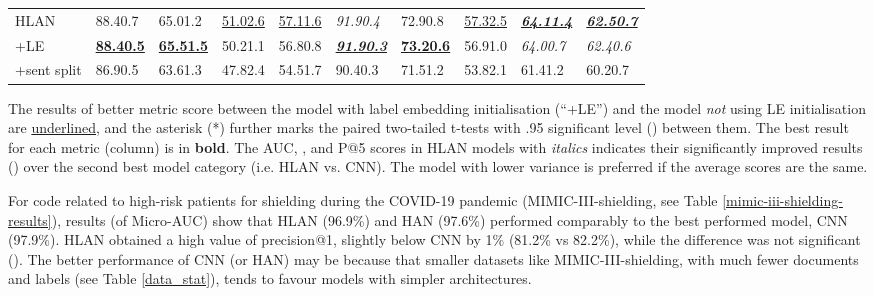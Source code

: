 \documentclass[final,5p,times,twocolumn]{elsarticle}
\begin{document}
\begin{table*}[th]
\begin{threeparttable}
\begin{tabular}{lllll|llll|l}
\cline{1-10}
HLAN                  & 88.40.7 & 65.01.2 & \underline{51.02.6} & \underline{57.11.6} & \textit{91.90.4} & 72.90.8 & \underline{57.32.5} & \textit{\textbf{\underline{64.11.4}}} & \textit{\textbf{\underline{62.50.7}}} \\
+LE                   & \textbf{\underline{88.40.5}} & \textbf{\underline{65.51.5}} & 50.21.1 & 56.80.8 & \textit{\textbf{\underline{91.90.3}}} & \textbf{\underline{73.20.6}} & 56.91.0 & \textit{64.00.7} & \textit{62.40.6} \\
+sent split           & 86.90.5 & 63.61.3 & 47.82.4 & 54.51.7 & 90.40.3 & 71.51.2 & 53.82.1 & 61.41.2 & 60.20.7 \\
\cline{1-10}
\end{tabular}
\begin{tablenotes}
\item The results of better metric score between the model with label embedding initialisation (``+LE'') and the model \textit{not} using LE initialisation are \underline{underlined}, and the asterisk (*) further marks the paired two-tailed t-tests with .95 significant level () between them. The best result for each metric (column) is in \textbf{bold}. The AUC, , and P@5 scores in HLAN models with \textit{italics} indicates their significantly improved results () over the second best model category (i.e. HLAN vs. CNN). The model with lower variance is preferred if the average scores are the same.
\end{tablenotes}
\end{threeparttable}
\end{table*}

For code related to high-risk patients for shielding during the COVID-19 pandemic (MIMIC-III-shielding, see Table \ref{mimic-iii-shielding-results}), results (of Micro-AUC) show that HLAN (96.9\%) and HAN (97.6\%) performed comparably to the best performed model, CNN (97.9\%). HLAN obtained a high value of precision@1, slightly below CNN by 1\% (81.2\% vs 82.2\%), while the difference was not significant (). The better performance of CNN (or HAN) may be because that smaller datasets like MIMIC-III-shielding, with much fewer documents and labels (see Table \ref{data_stat}), tends to favour models with simpler architectures.
\end{document}
